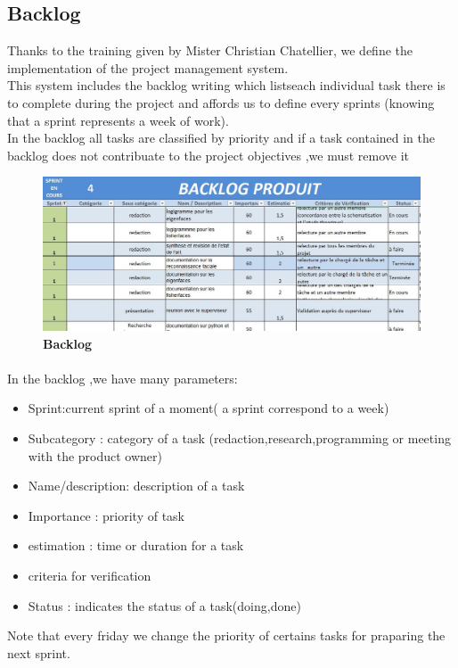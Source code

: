 \subsection{ Backlog}
Thanks to the training given by Mister Christian Chatellier, we define the implementation of the project management system.
\\This system includes the backlog writing which listseach individual task there is to complete during the project and affords us to define every sprints (knowing that a sprint represents a week of work).
\\In the backlog all tasks are classified by priority and if a task contained in the backlog does not contribuate to the project objectives ,we must remove it
\begin{figure}[bth]%
\begin{center}
\includegraphics[scale=0.60]{baclog}%
\caption{\textbf{Backlog}}%
\end {center}
\end{figure}
\paragraph{}
In the backlog ,we have many parameters:
\begin{itemize}
\item Sprint:current sprint of a moment( a sprint correspond to a week)
\item Subcategory :  category of a task (redaction,research,programming or meeting with the product owner)
\item Name/description: description of a task
\item Importance : priority of task
\item estimation : time or duration for a task
\item criteria for verification
\item Status : indicates the status of a  task(doing,done)
\end{itemize}
Note that every friday we change the priority of certains tasks for praparing the next sprint.
\newpage
